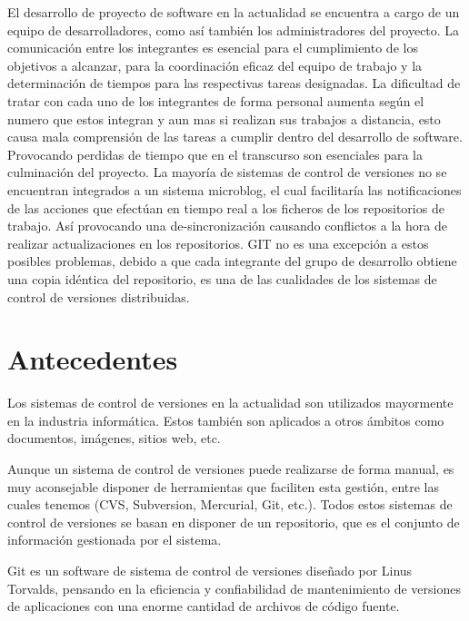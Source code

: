 \documentclass[letterpaper, 12pt,double,graphicx,caption,rotating]{report}
\begin{document}
\begin{titlepage}
El desarrollo de proyecto de software en la actualidad se encuentra a cargo de un equipo de desarrolladores, como así también los administradores del proyecto.
La comunicación entre los integrantes es esencial para el cumplimiento de los objetivos a alcanzar, para la coordinación eficaz del equipo de trabajo y la determinación de tiempos para las respectivas tareas designadas.
La dificultad de tratar con cada uno de los integrantes de forma personal aumenta según el numero que estos integran y aun mas si realizan sus trabajos a distancia, esto causa mala comprensión de las tareas a cumplir dentro del desarrollo de software. Provocando perdidas de tiempo que en el transcurso son esenciales para la culminación del proyecto.
La mayoría de sistemas de control de versiones no se encuentran integrados a un sistema microblog, el cual facilitaría las notificaciones de las acciones que efectúan en tiempo real a los ficheros de los repositorios de trabajo. Así provocando una de-sincronización causando conflictos a la hora de realizar actualizaciones en los repositorios.
GIT no es una excepción a estos posibles problemas, debido a que cada integrante del grupo de desarrollo obtiene una copia idéntica del repositorio, es una de las cualidades de los sistemas de control de versiones distribuidas.

\end{titlepage}
\newpage
\tableofcontents








\section{Antecedentes}
Los sistemas de control de versiones en la actualidad son utilizados mayormente en la industria informática. Estos también son aplicados a otros ámbitos como documentos, imágenes, sitios web, etc.

Aunque un sistema de control de versiones puede realizarse de forma manual, es muy aconsejable disponer de herramientas que faciliten esta gestión, entre las cuales tenemos (CVS, Subversion, Mercurial, Git, etc.). Todos estos sistemas de control de versiones se basan en disponer de un repositorio, que es el conjunto de información gestionada por el sistema.

Git es un software de sistema de control de versiones diseñado por Linus Torvalds, pensando en la eficiencia y confiabilidad de mantenimiento de versiones de aplicaciones con una enorme cantidad de archivos de código fuente.
\end{document}
